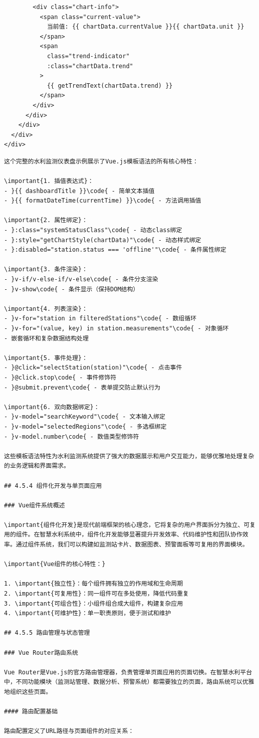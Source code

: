 \begin{verbatim}
        <div class="chart-info">
          <span class="current-value">
            当前值: {{ chartData.currentValue }}{{ chartData.unit }}
          </span>
          <span 
            class="trend-indicator"
            :class="chartData.trend"
          >
            {{ getTrendText(chartData.trend) }}
          </span>
        </div>
      </div>
    </div>
  </div>
</div>
\end{verbatim}

\begin{lstlisting}
这个完整的水利监测仪表盘示例展示了Vue.js模板语法的所有核心特性：

\important{1. 插值表达式}：
- }{{ dashboardTitle }}\code{ - 简单文本插值
- }{{ formatDateTime(currentTime) }}\code{ - 方法调用插值

\important{2. 属性绑定}：
- }:class="systemStatusClass"\code{ - 动态class绑定
- }:style="getChartStyle(chartData)"\code{ - 动态样式绑定
- }:disabled="station.status === 'offline'"\code{ - 条件属性绑定

\important{3. 条件渲染}：
- }v-if/v-else-if/v-else\code{ - 条件分支渲染
- }v-show\code{ - 条件显示（保持DOM结构）

\important{4. 列表渲染}：
- }v-for="station in filteredStations"\code{ - 数组循环
- }v-for="(value, key) in station.measurements"\code{ - 对象循环
- 嵌套循环和复杂数据结构处理

\important{5. 事件处理}：
- }@click="selectStation(station)"\code{ - 点击事件
- }@click.stop\code{ - 事件修饰符
- }@submit.prevent\code{ - 表单提交防止默认行为

\important{6. 双向数据绑定}：
- }v-model="searchKeyword"\code{ - 文本输入绑定
- }v-model="selectedRegions"\code{ - 多选框绑定
- }v-model.number\code{ - 数值类型修饰符

这些模板语法特性为水利监测系统提供了强大的数据展示和用户交互能力，能够优雅地处理复杂的业务逻辑和界面需求。

## 4.5.4 组件化开发与单页面应用

### Vue组件系统概述

\important{组件化开发}是现代前端框架的核心理念，它将复杂的用户界面拆分为独立、可复用的组件。在智慧水利系统中，组件化开发能够显著提升开发效率、代码维护性和团队协作效率。通过组件系统，我们可以构建如监测站卡片、数据图表、预警面板等可复用的界面模块。

\important{Vue组件的核心特性：}

1. \important{独立性}：每个组件拥有独立的作用域和生命周期
2. \important{可复用性}：同一组件可在多处使用，降低代码重复
3. \important{可组合性}：小组件组合成大组件，构建复杂应用
4. \important{可维护性}：单一职责原则，便于测试和维护

## 4.5.5 路由管理与状态管理

### Vue Router路由系统

Vue Router是Vue.js的官方路由管理器，负责管理单页面应用的页面切换。在智慧水利平台中，不同功能模块（监测站管理、数据分析、预警系统）都需要独立的页面，路由系统可以优雅地组织这些页面。

#### 路由配置基础

路由配置定义了URL路径与页面组件的对应关系：

\end{lstlisting}

